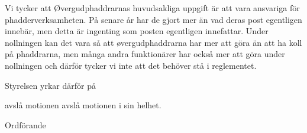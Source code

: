 \documentclass[../_main/handlingar.tex]{subfiles}
\begin{document}
\motionssvar
Vi tycker att Øvergudphaddrarnas huvudsakliga uppgift är att vara ansvariga för phadderverksamheten. På senare år har de gjort mer än vad deras post egentligen innebär, men detta är ingenting som posten egentligen innefattar. Under nollningen kan det vara så att øvergudphaddrarna har mer att göra än att ha koll på phaddrarna, men många andra funktionärer har också mer att göra under nollningen och därför tycker vi inte att det behöver stå i reglementet.

Styrelsen yrkar därför på

\begin{attsatser}
    \att avslå motionen avslå motionen i sin helhet.
\end{attsatser}


\begin{signatures}{1}
	\ist
	\signature{Daniel Bakic}{Ordförande}
\end{signatures}
\end{document}
